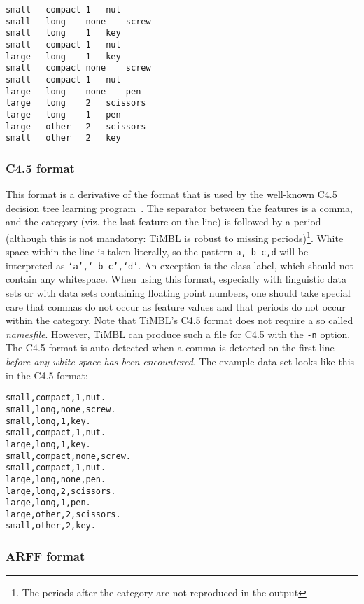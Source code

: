 \documentclass{report}
\begin{document}
\begin{footnotesize}
\begin{verbatim}
small	compact	1	nut
small	long	none	screw
small	long	1	key
small	compact	1	nut
large	long	1	key
small	compact	none	screw
small	compact	1	nut
large	long	none	pen
large	long	2	scissors
large	long	1	pen
large	other	2	scissors
small	other	2	key
\end{verbatim}
\end{footnotesize}

\subsubsection{C4.5 format}
\label{c45format}

This format is a derivative of the format that is used by the
well-known C4.5 decision tree learning program~\cite{Quinlan93}.  The
separator between the features is a comma, and the category (viz.  the
last feature on the line) is followed by a period (although this is
not mandatory: TiMBL is robust to missing periods)\footnote{The
periods after the category are not reproduced in the output}.  White
space within the line is taken literally, so the pattern {\tt a,\ b\
c,d} will be interpreted as {\tt `a',`\ b\ c',`d'}. An exception is the 
class label, which should not contain any whitespace. When using this
format, especially with linguistic data sets or with data sets
containing floating point numbers, one should take special care that
commas do not occur as feature values and that periods do not
occur within the category.  Note that TiMBL's C4.5 format does not
require a so called {\em namesfile}.  However, TiMBL can produce such
a file for C4.5 with the {\tt -n} option.  The C4.5 format is
auto-detected when a comma is detected on the first line {\em before
any white space has been encountered}. The example data set looks like
this in the C4.5 format:

\begin{footnotesize}
\begin{verbatim}
small,compact,1,nut.
small,long,none,screw.
small,long,1,key.
small,compact,1,nut.
large,long,1,key.
small,compact,none,screw.
small,compact,1,nut.
large,long,none,pen.
large,long,2,scissors.
large,long,1,pen.
large,other,2,scissors.
small,other,2,key.
\end{verbatim}
\end{footnotesize}

\subsubsection{ARFF format}
\label{arffformat}
\end{document}
